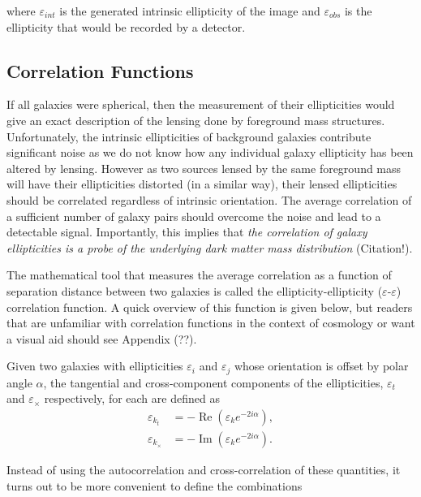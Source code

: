 \documentclass[%
 reprint,
 amsmath,amssymb,
 aps,nofootinbib
]{revtex4-1}
\begin{document}
\noindent where $\varepsilon_{int}$ is the generated intrinsic ellipticity of the image and $\varepsilon_{obs}$ is the ellipticity that would be recorded by a detector.


\subsection{Correlation Functions} \label{corr_functions}

If all galaxies were spherical, then the measurement of their ellipticities would give an exact description of the lensing done by foreground mass structures. Unfortunately, the intrinsic ellipticities of background galaxies contribute significant noise as we do not know how any individual galaxy ellipticity has been altered by lensing. However as two sources lensed by the same foreground mass will have their ellipticities distorted (in a similar way), their lensed ellipticities should be correlated regardless of intrinsic orientation. The average correlation of a sufficient number of galaxy pairs should overcome the noise and lead to a detectable signal. Importantly, this implies that \textit{the correlation of galaxy ellipticities is a probe of the underlying dark matter mass distribution} (Citation!).

The mathematical tool that measures the average correlation as a function of separation distance between two galaxies is called the ellipticity-ellipticity ($\varepsilon$-$\varepsilon$) correlation function. A quick overview of this function is given below, but readers that are unfamiliar with correlation functions in the context of cosmology or want a visual aid should see Appendix (??).

Given two galaxies with ellipticities $\varepsilon_i$ and $\varepsilon_j$ whose orientation is offset by polar angle $\alpha$, the tangential and cross-component components of the ellipticities, $\varepsilon_t$ and $\varepsilon_\times$ respectively, for each are defined as
\begin{align}
\varepsilon_{k_t}&=-\operatorname{Re}\left(\varepsilon_k e^{-2i\alpha}\right),\\
\varepsilon_{k_\times}&=-\operatorname{Im}\left(\varepsilon_k e^{-2i\alpha}\right).
\end{align}

\noindent Instead of using the autocorrelation and cross-correlation of these quantities, it turns out to be more convenient to define the combinations
\end{document}
